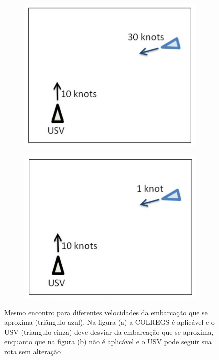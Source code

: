     \begin{figure}[H]
    \centering
    
        \begin{subfigure}{0.4\textwidth}
            \centering
            \includegraphics[width=\textwidth]{fig/chap1/colregs_applicable.png}
            \caption{}
            \label{fig:Kuwata2014_colregApplicable}
        \end{subfigure}
        \begin{subfigure}{0.4\textwidth}
            \centering
            \includegraphics[width=\textwidth]{fig/chap1/colregs_na.png}
            \caption{}
            \label{fig:Kuwata2014_colregNA}
        \end{subfigure}
    
    \caption{Mesmo encontro para diferentes velocidades da embarcação que se aproxima (triângulo azul). Na figura (a) a COLREGS é aplicável e o USV (triangulo cinza) deve desviar da embarcação que se aproxima, enquanto que na figura (b) não é aplicável e o USV pode seguir sua rota sem alteração}
    \label{fig:Kuwata2014_colregsInterpretation}
    \end{figure}